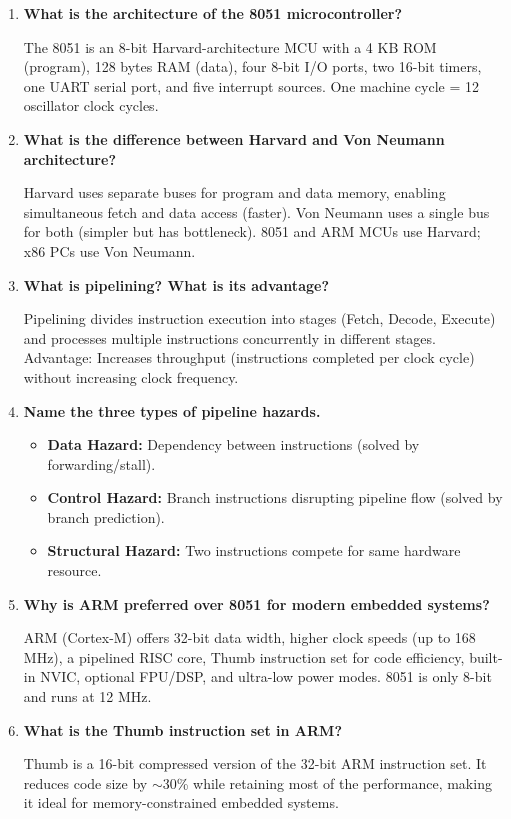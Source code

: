 \documentclass[12pt,a4paper]{article}
\newcommand{\Q}[1]{\textbf{#1}\par\noindent\ignorespaces}
\begin{document}
\begin{tcolorbox}[exambox, title={\textbf{Frequently Asked / Viva Questions}}]
\begin{enumerate}[topsep=0pt, label=\textbf{Q\arabic*.}, itemsep=5pt]
  \item \Q{What is the architecture of the 8051 microcontroller?}
    The 8051 is an 8-bit Harvard-architecture MCU with a 4 KB ROM (program), 128 bytes RAM (data), four 8-bit I/O ports, two 16-bit timers, one UART serial port, and five interrupt sources. One machine cycle = 12 oscillator clock cycles.
  \item \Q{What is the difference between Harvard and Von Neumann architecture?}
    Harvard uses separate buses for program and data memory, enabling simultaneous fetch and data access (faster). Von Neumann uses a single bus for both (simpler but has bottleneck). 8051 and ARM MCUs use Harvard; x86 PCs use Von Neumann.
  \item \Q{What is pipelining? What is its advantage?}
    Pipelining divides instruction execution into stages (Fetch, Decode, Execute) and processes multiple instructions concurrently in different stages. Advantage: Increases throughput (instructions completed per clock cycle) without increasing clock frequency.
  \item \Q{Name the three types of pipeline hazards.}
    \begin{itemize}[leftmargin=*, itemsep=1pt, topsep=2pt]
      \item \textbf{Data Hazard:} Dependency between instructions (solved by forwarding/stall).
      \item \textbf{Control Hazard:} Branch instructions disrupting pipeline flow (solved by branch prediction).
      \item \textbf{Structural Hazard:} Two instructions compete for same hardware resource.
    \end{itemize}
  \item \Q{Why is ARM preferred over 8051 for modern embedded systems?}
    ARM (Cortex-M) offers 32-bit data width, higher clock speeds (up to 168 MHz), a pipelined RISC core, Thumb instruction set for code efficiency, built-in NVIC, optional FPU/DSP, and ultra-low power modes. 8051 is only 8-bit and runs at 12 MHz.
  \item \Q{What is the Thumb instruction set in ARM?}
    Thumb is a 16-bit compressed version of the 32-bit ARM instruction set. It reduces code size by $\sim$30\% while retaining most of the performance, making it ideal for memory-constrained embedded systems.

\end{enumerate}
\end{tcolorbox}
\end{document}
